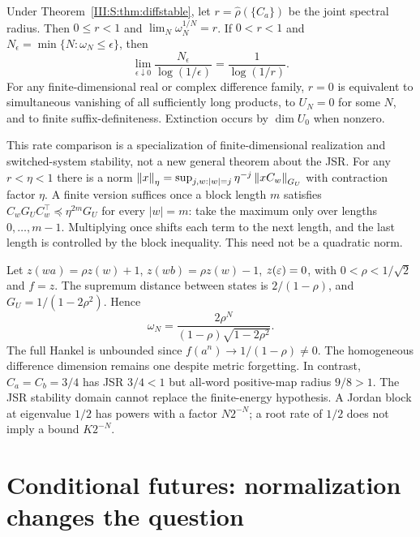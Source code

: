 \begin{theorem}\label{III:S:thm:jsr}
Under Theorem~\ref{III:S:thm:diffstable}, let $r=\widehat\rho(\{C_a\})$ be the joint spectral radius. Then $0\le r<1$ and $\lim_N\omega_N^{1/N}=r$. If $0<r<1$ and $N_\epsilon=\min\{N:\omega_N\le\epsilon\}$, then
\[
 \lim_{\epsilon\downarrow0}\frac{N_\epsilon}{\log(1/\epsilon)}
  =\frac1{\log(1/r)}.
\]
For any finite-dimensional real or complex difference family, $r=0$ is equivalent to simultaneous vanishing of all sufficiently long products, to $U_N=0$ for some $N$, and to finite suffix-definiteness. Extinction occurs by $\dim U_0$ when nonzero.
\end{theorem}

This rate comparison is a specialization of finite-dimensional realization and switched-system stability, not a new general theorem about the JSR. For any $r<\eta<1$ there is a norm $\left\lVert x\right\rVert_\eta=\sup_{j,w:|w|=j}\eta^{-j}\left\lVert xC_w\right\rVert_{G_U}$ with contraction factor $\eta$. A finite version suffices once a block length $m$ satisfies $C_wG_UC_w^\top\preceq\eta^{2m}G_U$ for every $|w|=m$: take the maximum only over lengths $0,\ldots,m-1$. Multiplying once shifts each term to the next length, and the last length is controlled by the block inequality. This need not be a quadratic norm.

\begin{example}
Let $z(wa)=\rho z(w)+1$, $z(wb)=\rho z(w)-1$, $z(\varepsilon)=0$, with $0<\rho<1/\sqrt2$ and $f=z$. The supremum distance between states is $2/(1-\rho)$, and $G_U=1/(1-2\rho^2)$. Hence
\[
 \omega_N=\frac{2\rho^N}{(1-\rho)\sqrt{1-2\rho^2}}.
\]
The full Hankel is unbounded since $f(a^n)\to1/(1-\rho)\ne0$. The homogeneous difference dimension remains one despite metric forgetting. In contrast, $C_a=C_b=3/4$ has JSR $3/4<1$ but all-word positive-map radius $9/8>1$. The JSR stability domain cannot replace the finite-energy hypothesis. A Jordan block at eigenvalue $1/2$ has powers with a factor $N2^{-N}$; a root rate of $1/2$ does not imply a bound $K2^{-N}$.
\end{example}

\section{Conditional futures: normalization changes the question}\label{III:S:sec:conditional}
